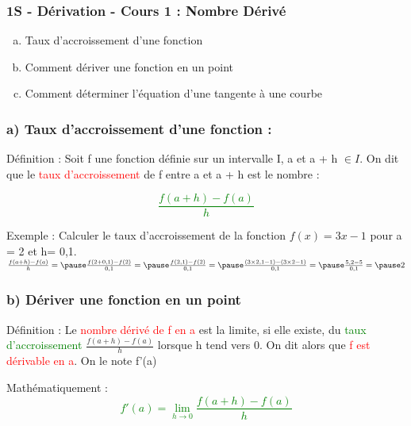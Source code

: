 \documentclass[t]{beamer}
\begin{document}
	\begin{frame}
		\frametitle{1S - Dérivation - Cours 1 : Nombre Dérivé}
		\begin{enumerate}[a)]
			\item Taux d'accroissement d'une fonction
			\item Comment dériver une fonction en un point
			\item Comment déterminer l'équation d'une tangente à une courbe
		\end{enumerate}
	\end{frame}

	\begin{frame}[label=pagebanale]
		\frametitle{a)  Taux d'accroissement d'une fonction : }
		\pause
		\begin{block}{Définition :}
			\pause
			Soit f une fonction définie sur un intervalle I, \pause a et a + h $ \in I$. \pause
			On dit que le \textcolor{red}{taux d'accroissement} de f \pause entre a et a + h \pause est le nombre : 
			\pause
		\end{block}

		{\huge \textcolor{green}{\[\frac{f(a+h) - f(a)}{h}\]}}

		\pause
		\begin{exampleblock}{Exemple :}
			\pause
			Calculer le taux d'accroissement \pause
			de la fonction $f(x)=3x -1$ \pause 
			pour a = 2 \pause et h= 0,1. \\
			\pause
			\( \frac{f(a+h) - f(a)}{h} = \pause
			\frac{f(2+0,1) - f(2)}{0,1} = \pause 
			\frac{f(2,1) - f(2)}{0,1} = \pause
			\frac{(3 \times 2,1 - 1) - (3 \times 2 - 1)}{0,1} = \pause
			\frac{ 5,2 - 5}{0,1} = \pause
			2
			\)
		\end{exampleblock}
	\end{frame}

	\begin{frame}[label=pagebanale]
		\frametitle{b) Dériver une fonction en un point}
		\pause
		\begin{block}{Définition :}
			\pause
			Le \textcolor{red}{nombre dérivé de f en a} est la limite, \pause si elle existe, \pause du \textcolor{green}{taux d'accroissement} \pause
			\(\frac{f(a+h) - f(a)}{h}\)
			\pause
			lorsque h tend vers 0. \pause 
			On dit alors que \textcolor{red}{f est dérivable en a}. \pause On le note f'(a)
			\pause
		\end{block}
		\begin{block}{Mathématiquement :}
			\pause
			{\Huge \textcolor{green}{\[ f'(a) = \lim\limits_{h \rightarrow 0}\frac{f(a+h) - f(a)}{h}\]}}
		\end{block}
	\end{frame}
\end{document}
